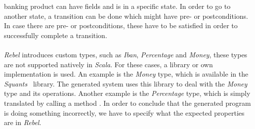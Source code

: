 banking product can have fields and is in a specific state. In order to go to
another state, a transition can be done which might have pre- or postconditions.
In case there are pre- or postconditions, these have to be satisfied in order to
successfully complete a transition.\\
\\
\textit{Rebel} introduces custom types, such as \textit{Iban},
\textit{Percentage} and \textit{Money}, these types are not supported natively
in \textit{Scala}. For these cases, a library or own implementation is used. An
example is the \textit{Money} type, which is available in the
\textit{Squants}~\cite{siteSquants2017} library. The generated system uses this
library to deal with the \textit{Money} type and its operations. Another example
is the \textit{Percentage} type, which is simply translated by calling a method
. In order to conclude that the generated program is doing
something incorrectly, we have to specify what the expected properties are in
\textit{Rebel}.


